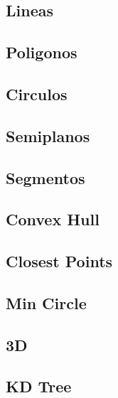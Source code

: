 \subsection{Lineas}
\raggedbottom
\hrulefill
\subsection{Poligonos}
\raggedbottom
\hrulefill
\subsection{Circulos}
\raggedbottom
\hrulefill
\subsection{Semiplanos}
\raggedbottom
\hrulefill
\subsection{Segmentos}
\raggedbottom
\hrulefill
\subsection{Convex Hull}
\raggedbottom
\hrulefill
\subsection{Closest Points}
\raggedbottom
\hrulefill
\subsection{Min Circle}
\raggedbottom
\hrulefill
\subsection{3D}
\raggedbottom
\hrulefill
\subsection{KD Tree}
\raggedbottom
\hrulefill

